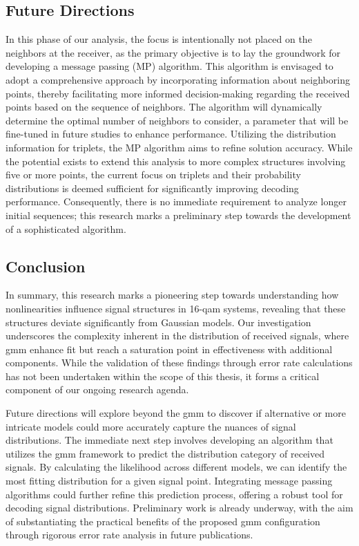 \subsection{Future Directions}
In this phase of our analysis, the focus is intentionally not placed on the neighbors at the receiver, as the primary objective is to lay the groundwork for developing a message passing (MP) algorithm. This algorithm is envisaged to adopt a comprehensive approach by incorporating information about neighboring points, thereby facilitating more informed decision-making regarding the received points based on the sequence of neighbors. The algorithm will dynamically determine the optimal number of neighbors to consider, a parameter that will be fine-tuned in future studies to enhance performance. Utilizing the distribution information for triplets, the MP algorithm aims to refine solution accuracy. While the potential exists to extend this analysis to more complex structures involving five or more points, the current focus on triplets and their probability distributions is deemed sufficient for significantly improving decoding performance. Consequently, there is no immediate requirement to analyze longer initial sequences; this research marks a preliminary step towards the development of a sophisticated algorithm.

\subsection{Conclusion}
In summary, this research marks a pioneering step towards understanding how nonlinearities influence signal structures in 16-\acrshort{qam} systems, revealing that these structures deviate significantly from Gaussian models. Our investigation underscores the complexity inherent in the distribution of received signals, where \acrlong{gmm} enhance fit but reach a saturation point in effectiveness with additional components. While the validation of these findings through error rate calculations has not been undertaken within the scope of this thesis, it forms a critical component of our ongoing research agenda.

Future directions will explore beyond the \acrshort{gmm} to discover if alternative or more intricate models could more accurately capture the nuances of signal distributions. The immediate next step involves developing an algorithm that utilizes the \acrshort{gmm} framework to predict the distribution category of received signals. By calculating the likelihood across different models, we can identify the most fitting distribution for a given signal point. Integrating message passing algorithms could further refine this prediction process, offering a robust tool for decoding signal distributions. Preliminary work is already underway, with the aim of substantiating the practical benefits of the proposed \acrshort{gmm} configuration through rigorous error rate analysis in future publications.


